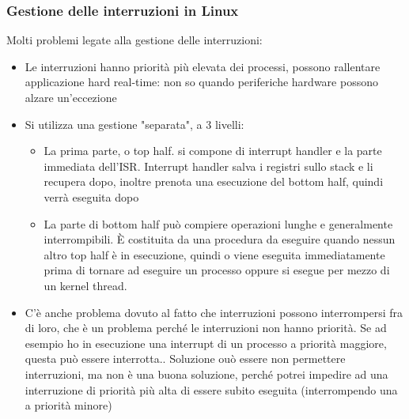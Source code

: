 \documentclass{article}
\begin{document}
\subsubsection{Gestione delle interruzioni in Linux}
Molti problemi legate alla gestione delle interruzioni:
\begin{itemize}
\item Le interruzioni hanno priorità più elevata dei processi, possono rallentare applicazione hard real-time: non so quando periferiche hardware possono alzare un'eccezione
\item Si utilizza una gestione "separata", a 3 livelli:
\begin{itemize}
\item La prima parte, o top half. si compone di interrupt handler e la parte immediata dell'ISR. Interrupt handler salva i registri sullo stack e li recupera dopo, inoltre prenota una esecuzione del bottom half, quindi verrà eseguita dopo
\item La parte di bottom half può compiere operazioni lunghe e generalmente interrompibili. È costituita da una procedura da eseguire quando nessun altro top half è in esecuzione, quindi o viene eseguita immediatamente prima di tornare ad eseguire un processo oppure si esegue per mezzo di un kernel thread.
\end{itemize}
\item C'è anche problema dovuto al fatto che interruzioni possono interrompersi fra di loro, che è un problema perché le interruzioni non hanno priorità. Se ad esempio ho in esecuzione una interrupt di un processo a priorità maggiore, questa può essere interrotta.. Soluzione ouò essere non permettere interruzioni, ma non è una buona soluzione, perché potrei impedire ad una interruzione di priorità più alta di essere subito eseguita (interrompendo una a priorità minore)
\end{itemize}
\end{document}
